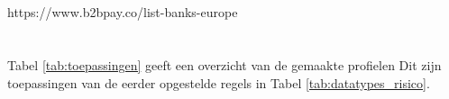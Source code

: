 \subsection{}
\label{subsubsec:Persoonlijke gegevens}

\subsubsection{}
\label{subsubsec:identificatiegerichte-regels}

\subsubsection{}
\label{subsubsec:gevoelige-persoonsgegevens}



\subsection{}
\label{subsubsec:betalingsgegevens}


https://www.b2bpay.co/list-banks-europe



\section{}
\label{subsubsec:toepassingen}

Tabel \ref{tab:toepassingen} geeft een overzicht van de gemaakte profielen 
Dit zijn toepassingen van de eerder opgestelde regels in Tabel \ref{tab:datatypes_risico}.



